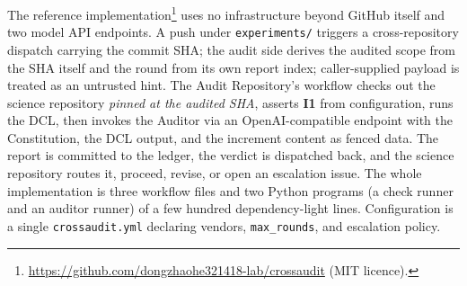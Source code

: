\documentclass[11pt]{article}
\newcommand{\invariant}[1]{\textbf{I#1}}
\begin{document}
The reference implementation\footnote{\url{https://github.com/dongzhaohe321418-lab/crossaudit} (MIT licence).} uses no infrastructure beyond GitHub itself and two model API endpoints. A push under \texttt{experiments/} triggers a cross-repository dispatch carrying the commit SHA; the audit side derives the audited scope from the SHA itself and the round from its own report index; caller-supplied payload is treated as an untrusted hint. The Audit Repository's workflow checks out the science repository \emph{pinned at the audited SHA}, asserts \invariant{1} from configuration, runs the DCL, then invokes the Auditor via an OpenAI-compatible endpoint with the Constitution, the DCL output, and the increment content as fenced data. The report is committed to the ledger, the verdict is dispatched back, and the science repository routes it, proceed, revise, or open an escalation issue. The whole implementation is three workflow files and two Python programs (a check runner and an auditor runner) of a few hundred dependency-light lines. Configuration is a single \texttt{crossaudit.yml} declaring vendors, \texttt{max\_rounds}, and escalation policy.
\end{document}
